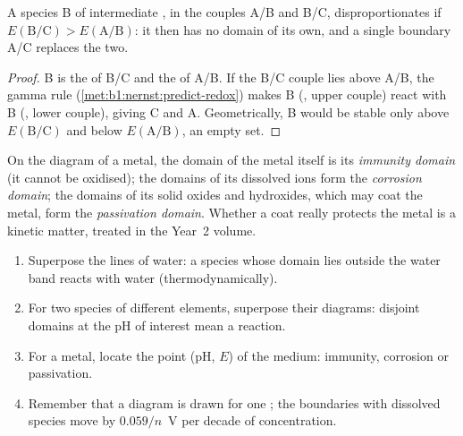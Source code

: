\begin{proposition}\label{prop:b1:e-ph-diagrams:disproportionation-criterion}
A species B of intermediate , in the couples A/B and
B/C, disproportionates if $E(\mathrm{B}/\mathrm{C}) > E(\mathrm{A}/\mathrm{B})$:
it then has no domain of its own, and a single boundary A/C replaces the
two.
\end{proposition}

\begin{proof}
B is the  of B/C and the  of A/B. If the B/C couple lies
above A/B, the gamma rule (\cref{met:b1:nernst:predict-redox}) makes B
(, upper couple) react with B (, lower couple), giving C
and A. Geometrically, B would be stable only above $E(\mathrm{B}/\mathrm{C})$
and below $E(\mathrm{A}/\mathrm{B})$, an empty set.
\end{proof}

\begin{definition}\label{def:b1:e-ph-diagrams:corrosion-domains}
On the diagram of a metal, the domain of the metal itself is its
\emph{immunity domain} (it cannot be oxidised);
the domains of its dissolved ions form the \emph{corrosion
domain}; the domains of its solid oxides and
hydroxides, which may coat the metal, form the \emph{passivation
domain}. Whether a coat really protects the
metal is a kinetic matter, treated in the Year~2 volume.
\end{definition}

\begin{method}\label{met:b1:e-ph-diagrams:read}
\begin{enumerate}
  \item Superpose the lines of water: a species whose domain lies outside
        the water band reacts with water (thermodynamically).
  \item For two species of different elements, superpose their diagrams:
        disjoint domains at the pH of interest mean a reaction.
  \item For a metal, locate the point (pH, $E$) of the medium: immunity,
        corrosion or passivation.
  \item Remember that a diagram is drawn for one ;
        the boundaries with dissolved species move by $0.059/n$~V per
        decade of concentration.
\end{enumerate}
\end{method}

